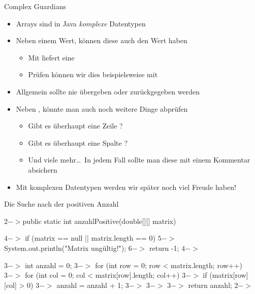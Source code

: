 \iffull
{\AddonFrame
\begin{frame}{Complex Guardians}
\begin{itemize}[<+(1)->]
    \itemsep11pt
    \item Arrays sind in Java \emph{komplexe} Datentypen 
    \item Neben einem  Wert, können diese auch den Wert  haben \begin{itemize}
        \item Mit  liefert  eine 
        \item Prüfen können wir dies beispielsweise mit 
    \end{itemize}
    \item Allgemein sollte nie  übergeben oder zurückgegeben werden
    \item Neben , könnte man auch noch weitere Dinge abprüfen \begin{itemize}
        \item Gibt es überhaupt eine Zeile ?
        \item Gibt es überhaupt eine Spalte ?
        \item Und viele mehr\ldots\ In jedem Fall sollte man diese mit einem Kommentar absichern
    \end{itemize}
    \item Mit komplexen Datentypen werden wir später noch viel Freude haben!
\end{itemize}
\end{frame}
}\fi

\begin{frame}[c,fragile]{Die Suche nach der positiven Anzahl}
\DoAnimations{}
\begin{plainjava}
$2->$public static int anzahlPositive(double[][] matrix) {
$4->$    if (matrix == null || matrix.length == 0) {
$5->$        System.out.println("Matrix ungültig!");
$6->$        return -1;
$4->$    }

$3->$    int anzahl = 0;
$3->$    for (int row = 0; row < matrix.length; row++) {
$3->$        for (int col = 0; col < matrix[row].length; col++) {
$3->$            if (matrix[row][col] > 0)
$3->$                anzahl = anzahl + 1;
$3->$        }
$3->$    }
$3->$    return anzahl;
$2->$}
\end{plainjava}
\end{frame}

